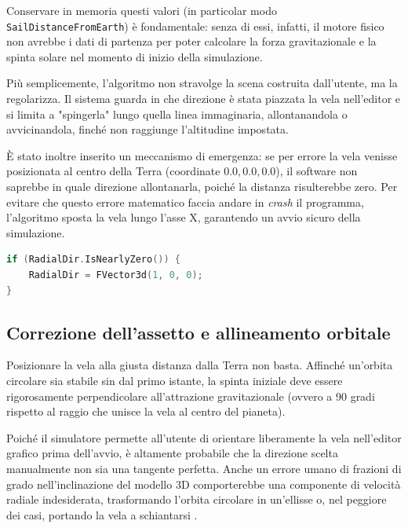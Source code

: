 Conservare in memoria questi valori (in particolar modo \lstinline|SailDistanceFromEarth|) è fondamentale: senza di essi, infatti, il motore fisico non avrebbe i dati di partenza per poter calcolare la forza gravitazionale e la spinta solare nel momento di inizio della simulazione.

Più semplicemente, l'algoritmo non stravolge la scena costruita dall'utente, ma la regolarizza. Il sistema guarda in che direzione è stata piazzata la vela nell'editor e si limita a "spingerla" lungo quella linea immaginaria, allontanandola o avvicinandola, finché non raggiunge l'altitudine impostata. 

È stato inoltre inserito un meccanismo di emergenza: se per errore la vela venisse posizionata al centro della Terra (coordinate $0.0, 0.0, 0.0$), il software non saprebbe in quale direzione allontanarla, poiché la distanza risulterebbe zero. Per evitare che questo errore matematico faccia andare in \textit{crash} il programma, l'algoritmo sposta la vela lungo l'asse X, garantendo un avvio sicuro della simulazione.

\begin{lstlisting}[language=C++, caption={Meccanismo di sicurezza per posizionamento errato in \lstinline|SolarSail.cpp|.}]
if (RadialDir.IsNearlyZero()) {
    RadialDir = FVector3d(1, 0, 0); 
}
\end{lstlisting}


\subsection{Correzione dell'assetto e allineamento orbitale}

Posizionare la vela alla giusta distanza dalla Terra non basta. Affinché un'orbita circolare sia stabile sin dal primo istante, la spinta iniziale deve essere rigorosamente perpendicolare all'attrazione gravitazionale (ovvero a 90 gradi rispetto al raggio che unisce la vela al centro del pianeta). 

Poiché il simulatore permette all'utente di orientare liberamente la vela nell'editor grafico prima dell'avvio, è altamente probabile che la direzione scelta manualmente non sia una tangente perfetta. Anche un errore umano di frazioni di grado nell'inclinazione del modello 3D comporterebbe una componente di velocità radiale indesiderata, trasformando l'orbita circolare in un'ellisse o, nel peggiore dei casi, portando la vela a schiantarsi \cite{curtis2005orbital}.

